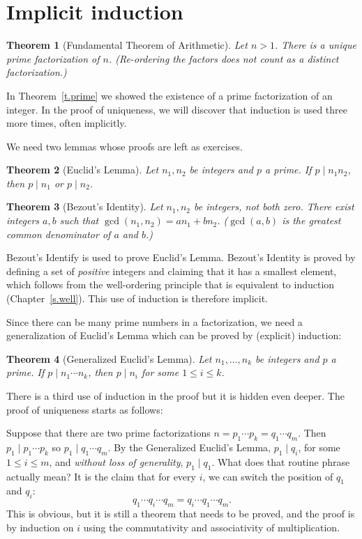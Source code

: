\documentclass[11pt,a4paper]{report}
\newtheorem{theorem}{Theorem}
\begin{document}
\section{Implicit induction}\label{s.unique}

\begin{theorem}[Fundamental Theorem of Arithmetic]
Let $n>1$. There is a \emph{unique} prime factorization of $n$. (Re-ordering the factors does not count as a distinct factorization.)
\end{theorem}

In Theorem~\ref{t.prime} we showed the existence of a prime factorization of an integer. In the proof of uniqueness, we will discover that induction is used three more times, often implicitly.

We need two lemmas whose proofs are left as exercises.

\begin{theorem}[Euclid's Lemma]
Let $n_1,n_2$ be integers and $p$ a prime. If $p \mid n_1 n_2$, then $p\mid n_1$ or $p\mid n_2$.
\end{theorem}

\begin{theorem}[Bezout's Identity]
Let $n_1, n_2$ be integers, not both zero. There exist integers $a,b$ such that $\gcd(n_1,n_2)=an_1+bn_2$. ($\gcd(a,b)$ is the greatest common denominator of $a$ and $b$.)
\end{theorem}

Bezout's Identify is used to prove Euclid's Lemma. Bezout's Identity is proved by defining a set of \emph{positive} integers and claiming that it has a smallest element, which follows from the well-ordering principle that is equivalent to induction (Chapter~\ref{s.well}). This use of induction is therefore implicit.

Since there can be many prime numbers in a factorization, we need a generalization of Euclid's Lemma which can be proved by (explicit) induction:

\begin{theorem}[Generalized Euclid's Lemma]
Let $n_1,\ldots,n_k$ be integers and $p$ a prime. If $p \mid n_1 \cdots n_k$, then $p\mid n_i$ for some $1\leq i \leq k$.
\end{theorem}

There is a third use of induction in the proof but it is hidden even deeper. The proof of uniqueness starts as follows:

Suppose that there are two prime factorizations $n=p_1 \cdots p_k = q_1 \cdots q_m$. Then $p_1\mid p_1 \cdots p_k$ so $p_1 \mid q_1 \cdots q_m$. By the Generalized Euclid's Lemma, $p_1 \mid q_i$, for some $1\leq i \leq m$, and \emph{without loss of generality}, $p_1 \mid q_1$. What does that routine phrase actually mean? It is the claim that for every $i$, we can switch the position of $q_1$ and $q_i$:
\[
q_1 \cdots q_i \cdots q_m = q_i \cdots q_1 \cdots q_m.
\]
This is obvious, but it is still a theorem that needs to be proved, and the proof is by induction on $i$ using the commutativity and associativity of multiplication.
\end{document}
